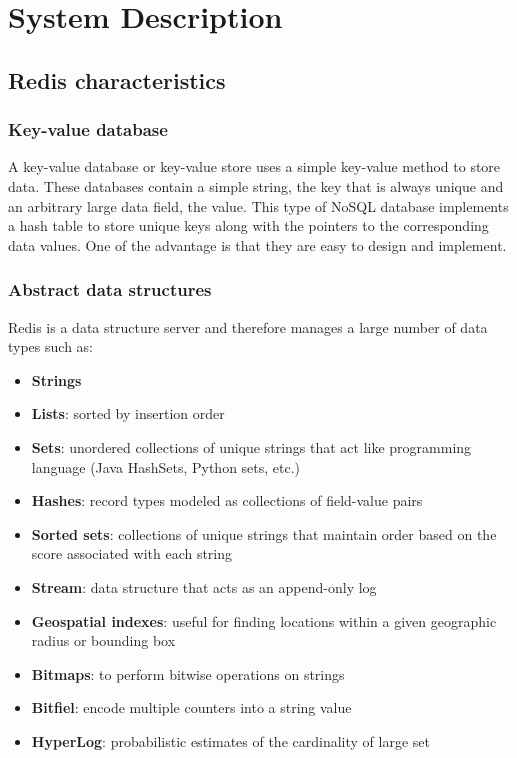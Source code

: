 \documentclass[runningheads]{llncs}
\begin{document}
\section{System Description}
\subsection{Redis characteristics}

\subsubsection{Key-value database}
A key-value database or key-value store uses a simple key-value method to store data. These databases contain a simple string, the key that is always unique and an arbitrary large data field, the value. 
This type of NoSQL database implements a hash table to store unique keys along with the pointers to the corresponding data values. One of the advantage is that they are easy to design and implement.

\subsubsection{Abstract data structures}
Redis is a data structure server and therefore manages a large number of data types such as:
\begin{itemize}
    \item \textbf{Strings}
    \item \textbf{Lists}: sorted by insertion order
    \item \textbf{Sets}: unordered collections of unique strings that act like programming language (Java HashSets, Python sets, etc.)
    \item \textbf{Hashes}: record types modeled as collections of field-value pairs
    \item \textbf{Sorted sets}: collections of unique strings that maintain order based on the score associated with each string
    \item \textbf{Stream}: data structure that acts as an append-only log
    \item \textbf{Geospatial indexes}: useful for finding locations within a given geographic radius or bounding box
    \item \textbf{Bitmaps}: to perform bitwise operations on strings
    \item \textbf{Bitfiel}: encode multiple counters into a string value
    \item \textbf{HyperLog}: probabilistic estimates of the cardinality of large set
\end{itemize}
\end{document}
